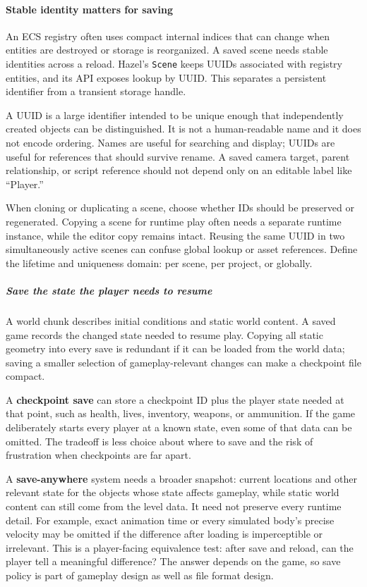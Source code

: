 \paragraph{Stable identity matters for saving}\label{stable-identity-matters-for-saving}

An ECS registry often uses compact internal indices that can change when entities are destroyed or storage is reorganized. A saved scene needs stable identities across a reload. Hazel's \texttt{Scene} keeps UUIDs associated with registry entities, and its API exposes lookup by UUID. This separates a persistent identifier from a transient storage handle.

A UUID is a large identifier intended to be unique enough that independently created objects can be distinguished. It is not a human-readable name and it does not encode ordering. Names are useful for searching and display; UUIDs are useful for references that should survive rename. A saved camera target, parent relationship, or script reference should not depend only on an editable label like ``Player.''

When cloning or duplicating a scene, choose whether IDs should be preserved or regenerated. Copying a scene for runtime play often needs a separate runtime instance, while the editor copy remains intact. Reusing the same UUID in two simultaneously active scenes can confuse global lookup or asset references. Define the lifetime and uniqueness domain: per scene, per project, or globally.

\subparagraph{Save the state the player needs to resume}\label{save-the-state-the-player-needs-to-resume}

A world chunk describes initial conditions and static world content. A saved game records the changed state needed to resume play. Copying all static geometry into every save is redundant if it can be loaded from the world data; saving a smaller selection of gameplay-relevant changes can make a checkpoint file compact.

A \textbf{checkpoint save} can store a checkpoint ID plus the player state needed at that point, such as health, lives, inventory, weapons, or ammunition. If the game deliberately starts every player at a known state, even some of that data can be omitted. The tradeoff is less choice about where to save and the risk of frustration when checkpoints are far apart.

A \textbf{save-anywhere} system needs a broader snapshot: current locations and other relevant state for the objects whose state affects gameplay, while static world content can still come from the level data. It need not preserve every runtime detail. For example, exact animation time or every simulated body's precise velocity may be omitted if the difference after loading is imperceptible or irrelevant. This is a player-facing equivalence test: after save and reload, can the player tell a meaningful difference? The answer depends on the game, so save policy is part of gameplay design as well as file format design.

